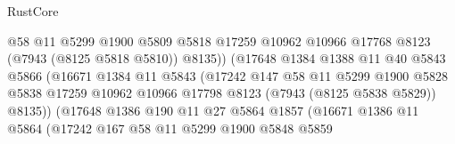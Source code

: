\begin{lexlean}{RustCore}
\begin{coremodule}
                                      @58
                                      @11
                                      @5299
                                      @1900
                                      @5809
                                      @5818
                                      @17259
                                      @10962
                                      @10966
                                      @17768
                                      @8123
                                      (@7943 (@8125 @5818 @5810))
                                      @8135))
                                  (@17648
                                    @1384
                                    @1388
                                    @11
                                    @40
                                    @5843
                                    @5866
                                    (@16671
                                      @1384
                                      @11
                                      @5843
                                      (@17242
                                        @147
                                        @58
                                        @11
                                        @5299
                                        @1900
                                        @5828
                                        @5838
                                        @17259
                                        @10962
                                        @10966
                                        @17798
                                        @8123
                                        (@7943 (@8125 @5838 @5829))
                                        @8135))
                                    (@17648
                                      @1386
                                      @190
                                      @11
                                      @27
                                      @5864
                                      @1857
                                      (@16671
                                        @1386
                                        @11
                                        @5864
                                        (@17242
                                          @167
                                          @58
                                          @11
                                          @5299
                                          @1900
                                          @5848
                                          @5859

\end{coremodule}
\end{lexlean}
